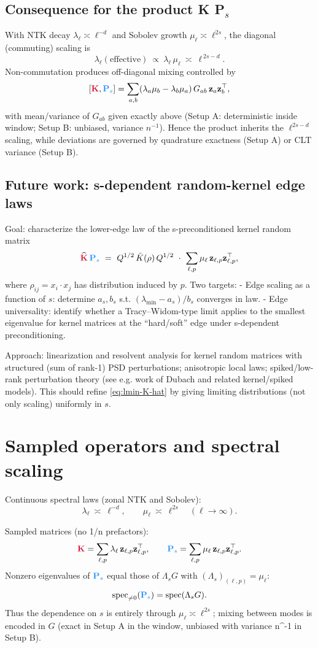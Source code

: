 \documentclass{article}
\newcommand{\Kmat}{\textcolor{kernelcolor}{\mathbf{K}}}
\newcommand{\Psmat}{\textcolor{sobolevcolor}{\mathbf{P}_s}}
\begin{document}
\subsection{Consequence for the product K P$_s$}
With NTK decay $\lambda_\ell\asymp \ell^{-d}$ and Sobolev growth $\mu_\ell\asymp \ell^{2s}$, the diagonal (commuting) scaling is
\[
\lambda_\ell(\text{effective})\ \propto\ \lambda_\ell\,\mu_\ell\ \asymp\ \ell^{\,2s-d}.
\]
Non-commutation produces off-diagonal mixing controlled by
\[
[\Kmat,\Psmat]=\sum_{a,b}(\lambda_a\mu_b-\lambda_b\mu_a)\,G_{ab}\,\mathbf{z}_a\mathbf{z}_b^\top,
\]
with mean/variance of $G_{ab}$ given exactly above (Setup A: deterministic inside window; Setup B: unbiased, variance $n^{-1}$). Hence the product inherits the $\ell^{2s-d}$ scaling, while deviations are governed by quadrature exactness (Setup A) or CLT variance (Setup B).

\subsection{Future work: s-dependent random-kernel edge laws}
Goal: characterize the lower-edge law of the s-preconditioned kernel random matrix
\[
\widehat{\Kmat}\,\Psmat\ =\ Q^{1/2}\,\tilde K(\rho)\,Q^{1/2}\ \cdot\ \sum_{\ell,p}\mu_\ell\,\mathbf{z}_{\ell,p}\mathbf{z}_{\ell,p}^\top,
\]
where $\rho_{ij}=x_i\cdot x_j$ has distribution induced by $p$. Two targets:
- Edge scaling as a function of $s$: determine $a_s,b_s$ s.t. $(\lambda_{\min}-a_s)/b_s$ converges in law.
- Edge universality: identify whether a Tracy–Widom-type limit applies to the smallest eigenvalue for kernel matrices at the “hard/soft” edge under s-dependent preconditioning.

Approach: linearization and resolvent analysis for kernel random matrices with structured (sum of rank-1) PSD perturbations; anisotropic local laws; spiked/low-rank perturbation theory (see e.g. work of Dubach and related kernel/spiked models). This should refine \eqref{eq:lmin-K-hat} by giving limiting distributions (not only scaling) uniformly in $s$.

\section{Sampled operators and spectral scaling}

Continuous spectral laws (zonal NTK and Sobolev):
\[
\lambda_\ell\ \asymp\ \ell^{-d},\qquad \mu_\ell\ \asymp\ \ell^{2s}\quad(\ell\to\infty).
\]

Sampled matrices (no 1/n prefactors):
\[
\Kmat=\sum_{\ell,p}\lambda_\ell\,\mathbf{z}_{\ell,p}\mathbf{z}_{\ell,p}^{\top},\qquad
\Psmat=\sum_{\ell,p}\mu_\ell\,\mathbf{z}_{\ell,p}\mathbf{z}_{\ell,p}^{\top}.
\]
Nonzero eigenvalues of $\Psmat$ equal those of $\Lambda_s G$ with $(\Lambda_s)_{(\ell,p)}=\mu_\ell$:
\[
\operatorname{spec}_{\neq 0}(\Psmat)=\operatorname{spec}(\Lambda_s G).
\]
Thus the dependence on $s$ is entirely through $\mu_\ell\asymp \ell^{2s}$; mixing between modes is encoded in $G$ (exact in Setup A in the window, unbiased with variance n^{-1} in Setup B).
\end{document}
